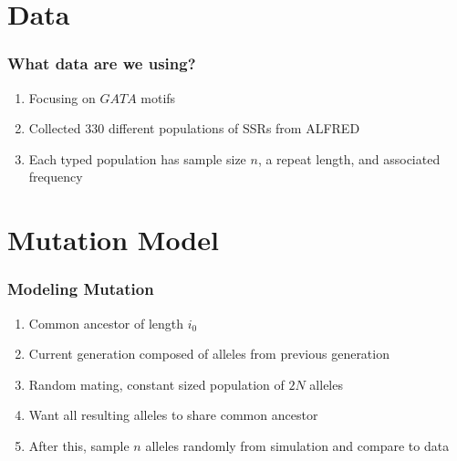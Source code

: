\documentclass[11pt]{beamer}
\begin{document}
	\section{Data}\label{sec:data}
	\begin{frame}
		\frametitle{What data are we using?}\bigskip

		\begin{enumerate}
			\item Focusing on $GATA$ motifs
			\item Collected 330 different populations of SSRs from ALFRED
			\item Each typed population has sample size $n$, a repeat length, and associated frequency
		\end{enumerate}\bigskip

	\end{frame}

	\section{Mutation Model}\label{sec:mutationModel}
	\begin{frame}
		\frametitle{Modeling Mutation}
		\begin{enumerate}
			\item Common ancestor of length $i_0$ \smallskip
			\item Current generation composed of alleles from previous generation \smallskip
			\item Random mating, constant sized population of $2N$ alleles \smallskip
			\item Want all resulting alleles to share common ancestor \smallskip
			\item After this, sample $n$ alleles randomly from simulation and compare to data \smallskip
		\end{enumerate}
	\end{frame}
\end{document}
